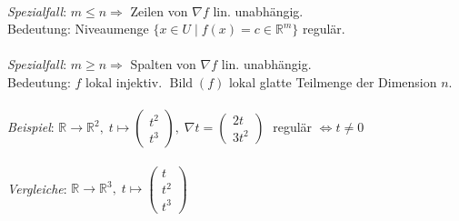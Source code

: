 \documentclass[12pt,a4paper,titlepage]{article}
\newcommand{\setR}{\mathbb{R}}
\begin{document}
\\
\textit{Spezialfall}: $m\leq n \Rightarrow $ Zeilen von $\nabla f$ lin. unabhängig. \\
Bedeutung: Niveaumenge $\{x\in U\mid f(x)=c\in\setR^m\}$ regulär. \\
\\
\textit{Spezialfall}: $m\geq n \Rightarrow $ Spalten von $\nabla f$ lin. unabhängig. \\
Bedeutung: $f$ lokal injektiv. $\operatorname{Bild}(f)$  lokal glatte Teilmenge der Dimension $n$. \\
\\
\textit{Beispiel}: $\setR\to\setR^2,\; t\mapsto\begin{pmatrix}t^2\\t^3\end{pmatrix},\; \nabla t=\begin{pmatrix}2t \\ 3t^2\end{pmatrix}\;$ regulär $\iff t\neq 0$ \\
\\
\textit{Vergleiche}: $\setR\to\setR^3,\; t\mapsto\begin{pmatrix}t\\t^2\\t^3\end{pmatrix}$
\end{document}
